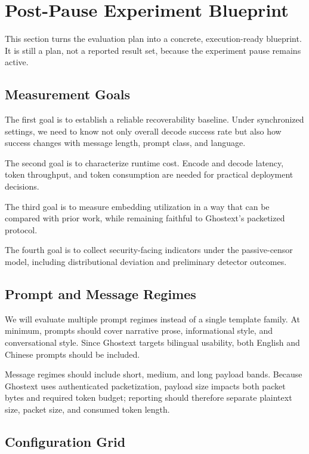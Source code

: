\section{Post-Pause Experiment Blueprint}

This section turns the evaluation plan into a concrete, execution-ready blueprint. It is still a plan, not a reported result set, because the experiment pause remains active.

\subsection{Measurement Goals}

The first goal is to establish a reliable recoverability baseline. Under synchronized settings, we need to know not only overall decode success rate but also how success changes with message length, prompt class, and language.

The second goal is to characterize runtime cost. Encode and decode latency, token throughput, and token consumption are needed for practical deployment decisions.

The third goal is to measure embedding utilization in a way that can be compared with prior work, while remaining faithful to Ghostext's packetized protocol.

The fourth goal is to collect security-facing indicators under the passive-censor model, including distributional deviation and preliminary detector outcomes.

\subsection{Prompt and Message Regimes}

We will evaluate multiple prompt regimes instead of a single template family. At minimum, prompts should cover narrative prose, informational style, and conversational style. Since Ghostext targets bilingual usability, both English and Chinese prompts should be included.

Message regimes should include short, medium, and long payload bands. Because Ghostext uses authenticated packetization, payload size impacts both packet bytes and required token budget; reporting should therefore separate plaintext size, packet size, and consumed token length.

\subsection{Configuration Grid}

